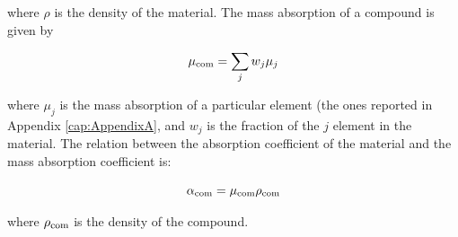 \begin{flushleft}
where $\rho $ is the density of the material. The mass absorption of a compound is given by
\end{flushleft}

\begin{equation}
\mu \textsubscript{com} = \sum_{j} w_j \mu_j
\label{eq: mu_com}
\end{equation}

\begin{flushleft}
where $\mu_j$ is the mass absorption of a particular element (the ones reported in Appendix \ref{cap:AppendixA}, and $w_j $ is the fraction of the $j $ element in the material. The relation between the absorption coefficient of the material and the mass absorption coefficient is:
\end{flushleft}

\begin{equation}
\alpha \textsubscript{com} = \mu \textsubscript{com} \rho \textsubscript{com}
\label{eq: alpha com}
\end{equation}

\begin{flushleft}
where $\rho \textsubscript{com}$ is the density of the compound.
\end{flushleft}

